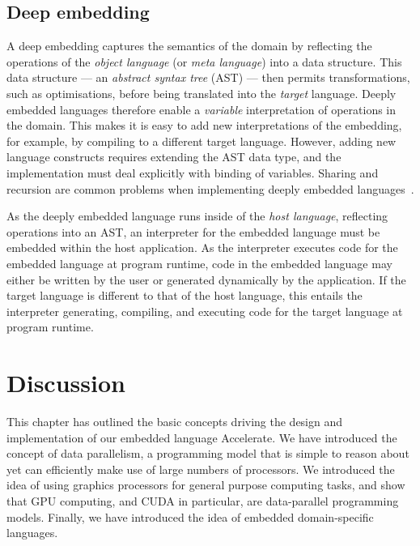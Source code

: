 \subsection{Deep embedding}

A deep embedding captures the semantics of the domain by reflecting the
operations of the \emph{object language}\lang[object]{} (or \emph{meta
language}) into a data structure. This data
structure --- an \emph{abstract syntax tree} (AST\AST) --- then permits
transformations, such as optimisations, before being translated into the
\emph{target} language. Deeply embedded languages therefore enable a
\emph{variable} interpretation of operations in the domain. This makes it is
easy to add new interpretations of the embedding, for example, by compiling to a
different target language. However, adding new language constructs requires
extending the AST data type, and the implementation must deal explicitly with
binding of variables. Sharing and recursion are common problems when
implementing deeply embedded languages~\cite{Gill:2009dx}.

As the deeply embedded language\lang[embedded]{} runs inside of the \emph{host
language}\lang[host]{}, reflecting operations into an AST\AST{}, an interpreter
for the embedded language must be embedded within the host application.
As the interpreter executes code for the embedded language at program runtime,
code in the embedded language may either be written by the user or generated
dynamically by the application. If the target language is different to that of
the host language, this entails the interpreter generating, compiling, and
executing code for the target language at program runtime.


\section{Discussion}

This chapter has outlined the basic concepts driving the design and
implementation of our embedded language Accelerate. We have introduced the
concept of data parallelism, a programming model that is simple to reason about
yet can efficiently make use of large numbers of processors. We introduced the
idea of using graphics processors for general purpose computing tasks, and show
that GPU computing, and CUDA in particular, are data-parallel programming
models. Finally, we have introduced the idea of embedded domain-specific
languages.

